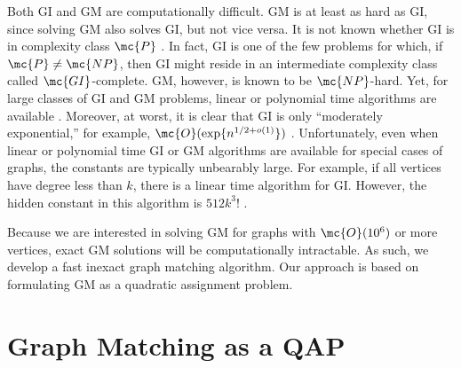 \documentclass[10pt,journal,cspaper,compsoc]{IEEEtran}
\begin{document}
Both GI and GM are computationally difficult. GM is at least as hard as GI, since solving GM also solves GI, but not vice versa. It is not known whether GI is in complexity class $\mc{P}$ \cite{Fortin1996}.  In fact, GI is one of the few problems for which, if $\mc{P} \neq \mc{NP}$, then GI might reside in an intermediate complexity class called $\mc{GI}$-complete.  GM, however, is known to be $\mc{NP}$-hard.    
Yet, for large classes of GI and GM problems, linear or polynomial time algorithms are available \cite{Babai1980}.  Moreover, at worst, it is clear that GI is only ``moderately exponential,'' for example, $\mc{O}(\exp\{n^{1/2 + o(1)}\})$ \cite{Babai1981}.  Unfortunately, even when linear or polynomial time GI or GM algorithms are available for special cases of graphs, the constants are typically unbearably large.  For example, if all vertices have degree less than $k$, there is a linear time algorithm for GI.  However, the hidden constant in this algorithm is $512k^3!$ \cite{Chen1994}.  

Because we are interested in solving GM for graphs with $\mc{O}(10^6)$ or more vertices, exact GM solutions will be computationally intractable. As such, we develop a fast inexact graph matching algorithm.   Our approach is based on formulating GM as a quadratic assignment problem.  %



\section{Graph  Matching as a QAP} %
\label{sub:preliminaries}

% 
\end{document}
